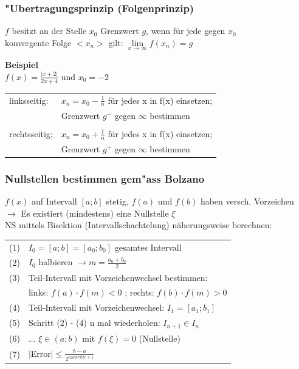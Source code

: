 		\subsubsection{"Ubertragungsprinzip (Folgenprinzip)}
			$f$ besitzt an der Stelle $x_0$ Grenzwert $g$, wenn für jede gegen $x_0$\\
			konvergente Folge $< x_n >$ gilt: $\lim\limits_{x \to \infty} f(x_n) = g$ 
			
			\textbf{Beispiel} \\
				$f(x) = \frac{\vert x + 2 \vert}{2x+4}$ und $x_0 = -2$ \\
				\begin{tabular}{ll}
					linksseitig: & $x_n = x_0 - \frac{1}{n}$ für jedes x in f(x) einsetzen; \\
					& Grenzwert $g^-$ gegen $\infty$ bestimmen \\
					\\
					rechtsseitig: & $x_n = x_0 + \frac{1}{n}$ für jedes x in f(x) einsetzen; \\
					& Grenzwert $g^+$ gegen $\infty$ bestimmen \\
				\end{tabular}
			
		\subsubsection{Nullstellen bestimmen gem"ass Bolzano}
			$f(x)$ auf Intervall $[a;b]$ stetig, $f(a)$ und $f(b)$ haben versch. Vorzeichen \\
			$\rightarrow$ Es existiert (mindestens) eine 	Nullstelle $\xi$\\	
			NS mittels Bisektion (Intervallschachtelung) näherungsweise berechnen: \\
			
			\begin{tabular}{ll}
				(1) & $I_0 = [a ; b] = [a_0 ; b_0]$ gesamtes Intervall \\
				(2) & $I_0$ halbieren $\rightarrow m = \frac{a_0 + b_0}{2}$ \\
				(3) & Teil-Intervall mit Vorzeichenwechsel bestimmen: \\
				    & links: $f(a) \cdot f(m) < 0$ ; rechts: $f(b) \cdot f(m) > 0$ \\
				(4) & Teil-Intervall mit Vorzeichenwechsel: $I_1 = [a_1 ; b_1]$ \\
				(5) & Schritt (2) - (4) n mal wiederholen: $I_{n+1} \in I_n$ \\
				(6) & ... $\xi \in (a;b)$ mit $f(\xi) = 0$ (Nullstelle) \\
				(7) & $ \vert $Error$ \vert \leq \frac{b-a}{2^{n Schritte + 1}} $ \\
			\end{tabular}						
				
